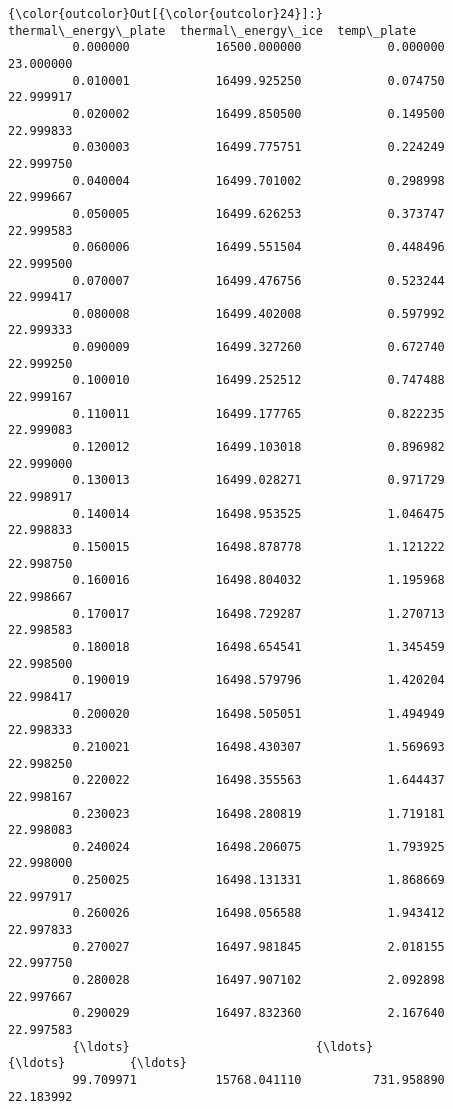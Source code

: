 \documentclass[11pt]{article}
\begin{document}
\begin{Verbatim}[commandchars=\\\{\}]
{\color{outcolor}Out[{\color{outcolor}24}]:}             thermal\_energy\_plate  thermal\_energy\_ice  temp\_plate
         0.000000            16500.000000            0.000000   23.000000
         0.010001            16499.925250            0.074750   22.999917
         0.020002            16499.850500            0.149500   22.999833
         0.030003            16499.775751            0.224249   22.999750
         0.040004            16499.701002            0.298998   22.999667
         0.050005            16499.626253            0.373747   22.999583
         0.060006            16499.551504            0.448496   22.999500
         0.070007            16499.476756            0.523244   22.999417
         0.080008            16499.402008            0.597992   22.999333
         0.090009            16499.327260            0.672740   22.999250
         0.100010            16499.252512            0.747488   22.999167
         0.110011            16499.177765            0.822235   22.999083
         0.120012            16499.103018            0.896982   22.999000
         0.130013            16499.028271            0.971729   22.998917
         0.140014            16498.953525            1.046475   22.998833
         0.150015            16498.878778            1.121222   22.998750
         0.160016            16498.804032            1.195968   22.998667
         0.170017            16498.729287            1.270713   22.998583
         0.180018            16498.654541            1.345459   22.998500
         0.190019            16498.579796            1.420204   22.998417
         0.200020            16498.505051            1.494949   22.998333
         0.210021            16498.430307            1.569693   22.998250
         0.220022            16498.355563            1.644437   22.998167
         0.230023            16498.280819            1.719181   22.998083
         0.240024            16498.206075            1.793925   22.998000
         0.250025            16498.131331            1.868669   22.997917
         0.260026            16498.056588            1.943412   22.997833
         0.270027            16497.981845            2.018155   22.997750
         0.280028            16497.907102            2.092898   22.997667
         0.290029            16497.832360            2.167640   22.997583
         {\ldots}                          {\ldots}                 {\ldots}         {\ldots}
         99.709971           15768.041110          731.958890   22.183992

\end{Verbatim}
\end{document}
